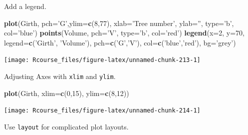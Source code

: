 \documentclass[]{book}
\newenvironment{Shaded}{\begin{snugshade}}{\end{snugshade}}
\newcommand{\KeywordTok}[1]{\textcolor[rgb]{0.13,0.29,0.53}{\textbf{#1}}}
\newcommand{\DataTypeTok}[1]{\textcolor[rgb]{0.13,0.29,0.53}{#1}}
\newcommand{\DecValTok}[1]{\textcolor[rgb]{0.00,0.00,0.81}{#1}}
\newcommand{\StringTok}[1]{\textcolor[rgb]{0.31,0.60,0.02}{#1}}
\newcommand{\NormalTok}[1]{#1}
\theoremstyle{definition}
\theoremstyle{definition}
\theoremstyle{definition}
\theoremstyle{remark}
\begin{document}
Add a legend.

\begin{Shaded}
\begin{Highlighting}[]
\KeywordTok{plot}\NormalTok{(Girth, }\DataTypeTok{pch=}\StringTok{'G'}\NormalTok{,}\DataTypeTok{ylim=}\KeywordTok{c}\NormalTok{(}\DecValTok{8}\NormalTok{,}\DecValTok{77}\NormalTok{), }\DataTypeTok{xlab=}\StringTok{'Tree number'}\NormalTok{, }\DataTypeTok{ylab=}\StringTok{''}\NormalTok{, }\DataTypeTok{type=}\StringTok{'b'}\NormalTok{, }\DataTypeTok{col=}\StringTok{'blue'}\NormalTok{)}
\KeywordTok{points}\NormalTok{(Volume, }\DataTypeTok{pch=}\StringTok{'V'}\NormalTok{, }\DataTypeTok{type=}\StringTok{'b'}\NormalTok{, }\DataTypeTok{col=}\StringTok{'red'}\NormalTok{)}
\KeywordTok{legend}\NormalTok{(}\DataTypeTok{x=}\DecValTok{2}\NormalTok{, }\DataTypeTok{y=}\DecValTok{70}\NormalTok{, }\DataTypeTok{legend=}\KeywordTok{c}\NormalTok{(}\StringTok{'Girth'}\NormalTok{, }\StringTok{'Volume'}\NormalTok{), }\DataTypeTok{pch=}\KeywordTok{c}\NormalTok{(}\StringTok{'G'}\NormalTok{,}\StringTok{'V'}\NormalTok{), }\DataTypeTok{col=}\KeywordTok{c}\NormalTok{(}\StringTok{'blue'}\NormalTok{,}\StringTok{'red'}\NormalTok{), }\DataTypeTok{bg=}\StringTok{'grey'}\NormalTok{)}
\end{Highlighting}
\end{Shaded}

\texttt{[image: Rcourse\_files/figure-latex/unnamed-chunk-213-1]}

Adjusting Axes with \texttt{xlim} and \texttt{ylim}.

\begin{Shaded}
\begin{Highlighting}[]
\KeywordTok{plot}\NormalTok{(Girth, }\DataTypeTok{xlim=}\KeywordTok{c}\NormalTok{(}\DecValTok{0}\NormalTok{,}\DecValTok{15}\NormalTok{), }\DataTypeTok{ylim=}\KeywordTok{c}\NormalTok{(}\DecValTok{8}\NormalTok{,}\DecValTok{12}\NormalTok{))}
\end{Highlighting}
\end{Shaded}

\texttt{[image: Rcourse\_files/figure-latex/unnamed-chunk-214-1]}

Use \texttt{layout} for complicated plot layouts.
\end{document}

